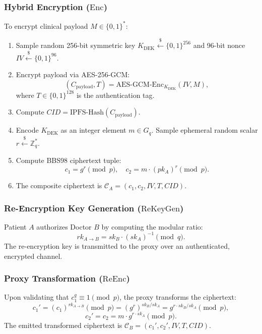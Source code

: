 \documentclass[journal,10pt,twocolumn]{IEEEtran}
\begin{document}
\subsubsection{Hybrid Encryption ($\mathrm{Enc}$)}
To encrypt clinical payload $M \in \{0, 1\}^*$:
\begin{enumerate}
    \item Sample random 256-bit symmetric key $K_{\mathrm{DEK}} \xleftarrow{\$} \{0, 1\}^{256}$ and 96-bit nonce $IV \xleftarrow{\$} \{0, 1\}^{96}$.
    \item Encrypt payload via AES-256-GCM:
    \begin{equation}
    (C_{\mathrm{payload}}, T) = \mathrm{AES\text{-}GCM\text{-}Enc}_{K_{\mathrm{DEK}}}(IV, M),
    \end{equation}
    where $T \in \{0, 1\}^{128}$ is the authentication tag.
    \item Compute $CID = \mathrm{IPFS\text{-}Hash}(C_{\mathrm{payload}})$.
    \item Encode $K_{\mathrm{DEK}}$ as an integer element $m \in G_q$. Sample ephemeral random scalar $r \xleftarrow{\$} \mathbb{Z}_q^*$.
    \item Compute BBS98 ciphertext tuple:
    \begin{equation}
    c_1 = g^r \pmod p, \quad c_2 = m \cdot (pk_A)^r \pmod p.
    \end{equation}
    \item The composite ciphertext is $\mathcal{C}_A = (c_1, c_2, IV, T, CID)$.
\end{enumerate}

\subsubsection{Re-Encryption Key Generation ($\mathrm{ReKeyGen}$)}
Patient $A$ authorizes Doctor $B$ by computing the modular ratio:
\begin{equation}
rk_{A \to B} = sk_B \cdot (sk_A)^{-1} \pmod q.
\end{equation}
The re-encryption key is transmitted to the proxy over an authenticated, encrypted channel.

\subsubsection{Proxy Transformation ($\mathrm{ReEnc}$)}
Upon validating that $c_1^q \equiv 1 \pmod p$, the proxy transforms the ciphertext:
\begin{equation}
c_1' = (c_1)^{rk_{A \to B}} \pmod p = (g^r)^{sk_B / sk_A} = g^{r \cdot sk_B / sk_A} \pmod p,
\end{equation}
\begin{equation}
c_2' = c_2 = m \cdot g^{r \cdot sk_A} \pmod p.
\end{equation}
The emitted transformed ciphertext is $\mathcal{C}_B = (c_1', c_2', IV, T, CID)$.
\end{document}
